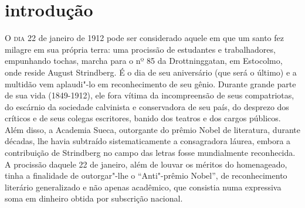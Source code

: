 \chapter[Introdução, por Ivo Barroso]{introdução}


\noindent\textsc{O dia 22} de janeiro de 1912 pode ser considerado aquele em que um santo
fez milagre em sua própria terra: uma procissão de estudantes e
trabalhadores, empunhando tochas, marcha para o nº 85 da
Drottninggatan, em Estocolmo, onde reside August Strindberg. É o dia de
seu aniversário (que será o último) e a multidão vem aplaudi"-lo em
reconhecimento de seu gênio. Durante grande parte de sua vida
(1849-1912), ele fora vítima da incompreensão de seus compatriotas,
do escárnio da sociedade calvinista e conservadora de seu país, do
desprezo dos críticos e de seus colegas escritores, banido dos teatros
e dos cargos públicos. Além disso, a Academia Sueca, outorgante do
prêmio Nobel de literatura, durante décadas, lhe havia subtraído
sistematicamente a consagradora láurea, embora a contribuição de
Strindberg no campo das letras fosse mundialmente reconhecida. A
procissão daquele 22 de janeiro, além de louvar os méritos do
homenageado, tinha a finalidade de outorgar"-lhe o ``Anti"-prêmio
Nobel'', de reconhecimento literário generalizado e não apenas
acadêmico, que consistia numa expressiva soma em dinheiro obtida por
subscrição nacional.

